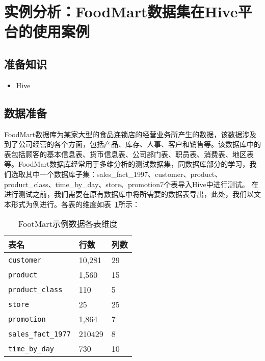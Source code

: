 \section{实例分析：FoodMart数据集在Hive平台的使用案例}\label{ux5b9eux4f8bux5206ux6790foodmartux6570ux636eux96c6ux5728hiveux5e73ux53f0ux7684ux4f7fux7528ux6848ux4f8b}

\subsection{准备知识}\label{ux51c6ux5907ux77e5ux8bc6}

\begin{itemize}
\itemsep1pt\parskip0pt
\item
  Hive
\end{itemize}

\subsection{数据准备}\label{ux6570ux636eux51c6ux5907}

FoodMart数据库为某家大型的食品连锁店的经营业务所产生的数据，该数据涉及到了公司经营的各个方面，包括产品、库存、人事、客户和销售等。该数据库中的表包括顾客的基本信息表、货币信息表、公司部门表、职员表、消费表、地区表等。FoodMart数据库经常用于多维分析的测试数据集，同数据库部分的学习，我们选取其中一个数据库子集：sales\_fact\_1997、customer、product、product\_class、time\_by\_day、store、promotion7个表导入Hive中进行测试。
在进行测试之前，我们需要在原有数据库中将所需要的数据表导出，此处，我们以文本形式为例进行。各表的维度如表~\ref{tab:Footmart-dimension}所示：


\begin{table}[!hbp]
	\centering
	\caption{FootMart示例数据各表维度}
	\label{tab:Footmart-dimension}
	\begin{tabular}{lll}
\toprule
	表名  &行数&列数\\
\midrule
\texttt{customer} &10,281 &29\\
\texttt{product} &1,560 &15\\
\texttt{product\_class} &110 &5\\
\texttt{store} &25 &25\\
\texttt{promotion} &1,864 &7\\
\texttt{sales\_fact\_1977} &210429 &8\\
\texttt{time\_by\_day} &730 &10\\
\bottomrule
	\end{tabular}

\end{table}

